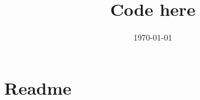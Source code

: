 \documentclass{article}
\begin{document}
\title{Code here}

\date{\today}

\maketitle

\section{Readme}
\end{document}
